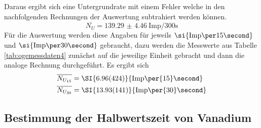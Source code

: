 Daraus ergibt sich eine Untergrundrate mit einem Fehler welche in den nachfolgenden Rechnungen der Auswertung subtrahiert werden können.
\begin{equation}
\overline{N_{U}} = \SI{139.29(446)}{{\text{Imp}}\per{300}\second}
\end{equation}
Für die Auswertung werden diese Angaben für jeweils $\si{{\text{Imp\per}{15}}\second}$ und $\si{{\text{Imp\per}{30}}\second}$ gebraucht, dazu werden die Messwerte aus Tabelle \ref{tab:ogemessdaten4} zunächst 
auf die jeweilige Einheit gebracht und dann die analoge Rechnung durchgeführt. Es ergibt sich
\begin{align}
\label{eqn:d1}
\overline{N_{U_{15}}} &= \SI{6.96(424)}{{\text{Imp}\per{15}\second}} \\   
\label{eqn:d2}
\overline{N_{U_{30}}} &= \SI{13.93(141)}{{\text{Imp}\per{30}\second}}
\end{align}

\subsection{Bestimmung der Halbwertszeit von Vanadium}

